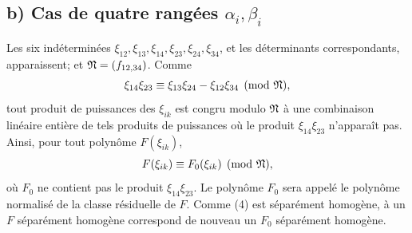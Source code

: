 \subsection*{b) Cas de quatre rangées $\alpha_i,\beta_i$}

Les six indéterminées $\xi_{12},\xi_{13},\xi_{14},\xi_{23},\xi_{24},\xi_{34}$, et les déterminants correspondants, apparaissent; et $\mathfrak N=(f_{12,34})$. Comme
\begin{equation}
        \xi_{14}\xi_{23}\equiv \xi_{13}\xi_{24}-\xi_{12}\xi_{34}\pmod{\mathfrak N},
\end{equation}
tout produit de puissances des $\xi_{ik}$ est congru modulo $\mathfrak N$ à une combinaison linéaire entière de tels produits de puissances où le produit $\xi_{14}\xi_{23}$ n'apparaît pas. Ainsi, pour tout polynôme $F(\xi_{ik})$,
\begin{equation}
        F(\xi_{ik})\equiv F_0(\xi_{ik})\pmod{\mathfrak N},
\end{equation}
où $F_0$ ne contient pas le produit $\xi_{14}\xi_{23}$. Le polynôme $F_0$ sera appelé le polynôme normalisé de la classe résiduelle de $F$. Comme (4) est séparément homogène, à un $F$ séparément homogène correspond de nouveau un $F_0$ séparément homogène.

